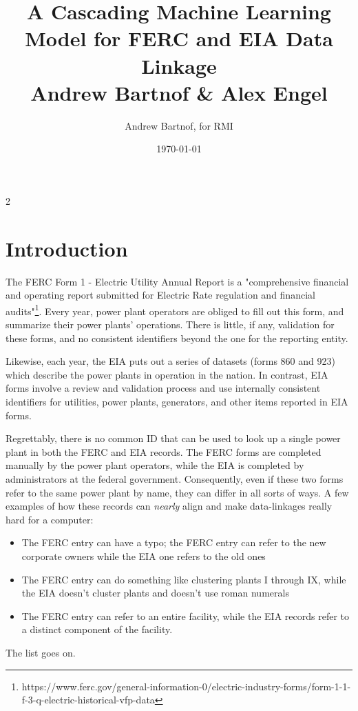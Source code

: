 \documentclass{article}
\begin{document}
\author{Andrew Bartnof, for RMI}
\title{A Cascading Machine Learning Model for FERC and EIA Data Linkage \\ Andrew Bartnof \& Alex Engel}
\date{\today}
2\maketitle



\section{Introduction}

The FERC Form 1 - Electric Utility Annual Report is a "comprehensive financial and operating report submitted for Electric Rate regulation and financial audits"\footnote{https://www.ferc.gov/general-information-0/electric-industry-forms/form-1-1-f-3-q-electric-historical-vfp-data}. 
Every year, power plant operators are obliged to fill out this form, and summarize their power plants’ operations.
There is little, if any, validation for these forms, and no consistent identifiers beyond the one for the reporting entity.

Likewise, each year, the EIA puts out a series of datasets (forms 860 and 923) which describe the power plants in operation in the nation.
In contrast, EIA forms involve a review and validation process and use internally consistent identifiers for utilities, power plants, generators, and other items reported in EIA forms.

Regrettably, there is no common ID that can be used to look up a single power plant in both the FERC and EIA records. 
The FERC forms are completed manually by the power plant operators, while the EIA is completed by administrators at the federal government. 
Consequently, even if these two forms refer to the same power plant by name, they can differ in all sorts of ways. 
A few examples of how these records can \emph{nearly} align and make data-linkages really hard for a computer:
\begin{itemize} 
\item The FERC entry can have a typo; the FERC entry can refer to the new corporate owners while the EIA one refers to the old ones
\item The FERC entry can do something like clustering plants I through IX, while the EIA doesn’t cluster plants and doesn’t use roman numerals
\item  The FERC entry can refer to an entire facility, while the EIA records refer to a distinct component of the facility. 
\end{itemize}
\noindent The list goes on.
\end{document}
